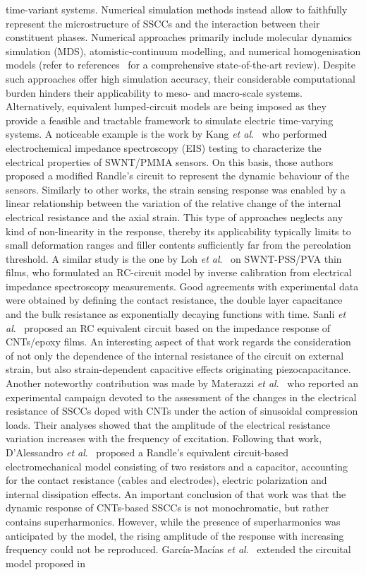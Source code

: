 \documentclass[a4paper,fleqn]{cas-sc}
\begin{document}
time-variant systems. Numerical simulation methods instead allow to faithfully represent the microstructure of SSCCs and the interaction between their constituent phases. Numerical approaches primarily include molecular dynamics simulation (MDS), atomistic-continuum modelling, and numerical homogenisation models (refer to references~\cite{Qiu2021,Zhao2021} for a comprehensive state-of-the-art review). Despite such approaches offer high simulation accuracy, their considerable computational burden hinders their applicability to meso- and macro-scale systems. Alternatively, equivalent lumped-circuit models are being imposed as they provide a feasible and tractable framework to simulate electric time-varying systems. A noticeable example is the work by Kang \textit{et al}.~\cite{Kang2006a} who performed electrochemical impedance spectroscopy (EIS) testing to characterize the electrical properties of SWNT/PMMA sensors. On this basis, those authors proposed a modified Randle's circuit to represent the dynamic behaviour of the sensors. Similarly to other works, the strain sensing response was enabled by a linear relationship between the variation of the relative change of the internal electrical resistance and the axial strain. This type of approaches neglects any kind of non-linearity in the response, thereby its applicability typically limits to small deformation ranges and filler contents sufficiently far from the percolation threshold. A similar study is the one by Loh \textit{et al}.~\cite{Loh2008} on SWNT-PSS/PVA thin films, who formulated an RC-circuit model by inverse calibration from electrical impedance spectroscopy measurements. Good agreements with experimental data were obtained by defining the contact resistance, the double layer capacitance and the bulk resistance as exponentially decaying functions with time. Sanli \textit{et al}.~\cite{Sanli2016} proposed an RC equivalent circuit based on the impedance response of CNTs/epoxy films. An interesting aspect of that work regards the consideration of not only the dependence of the internal resistance of the circuit on external strain, but also strain-dependent capacitive effects originating piezocapacitance. Another noteworthy contribution was made by Materazzi \textit{et al}.~\cite{Materazzi} who reported an experimental campaign devoted to the assessment of the changes in the electrical resistance of SSCCs doped with CNTs under the action of sinusoidal compression loads. Their analyses showed that the amplitude of the electrical resistance variation increases with the frequency of excitation. Following that work, D'Alessandro \textit{et al}.~\cite{DaAlessandro2014} proposed a Randle's equivalent circuit-based electromechanical model consisting of two resistors and a capacitor, accounting for the contact resistance (cables and electrodes), electric polarization and internal dissipation effects. An important conclusion of that work was that the dynamic response of CNTs-based SSCCs is not monochromatic, but rather contains superharmonics. However, while the presence of superharmonics was anticipated by the model, the rising amplitude of the response with increasing frequency could not be reproduced. Garc\'{i}a-Mac\'{i}as \textit{et al}.~\cite{garcia2017enhanced} extended the circuital model proposed in 
\end{document}
